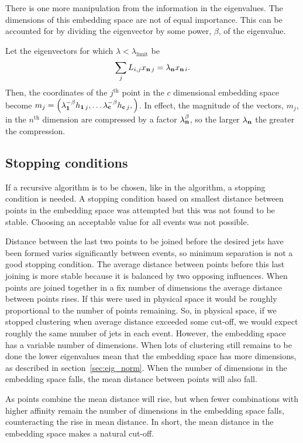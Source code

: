 There is one more manipulation from the information in the eigenvalues.
The dimensions of this embedding space are not of equal importance.
This can be accounted for by dividing the eigenvector by some power, \(\beta\), of the eigenvalue.

Let the eigenvectors for which \(\lambda < \lambda_\text{limit}\) be
\begin{equation}
    \sum_j L_{i, j} x_{\textbf{n}\,j} = \lambda_{\textbf{n}} x_{\textbf{n}\,i}.
\end{equation}
Then, the coordinates of the \(j^\text{th}\) point in the \(c\) dimensional embedding space
become \(m_j = \left(\lambda_{\textbf{1}}^{-\beta} h_{\textbf{1}\,j}, \dots \lambda_{\textbf{c}}^{-\beta} h_{\textbf{c}\,j},\right)\).
In effect, the magnitude of the vectors, \(m_j\), in the \(n^\text{th}\) dimension are compressed by a factor \(\lambda_{\textbf{n}}^\beta\),
so the larger \(\lambda_{\textbf{n}}\) the greater the compression.

\subsection{Stopping conditions}\label{sec:stopping_condintion}

If a recursive algorithm is to be chosen, like in the \genkt{} algorithm, a stopping condition is needed.
A stopping condition based on smallest distance between points in the embedding space was attempted 
but this was not found to be stable.
Choosing an acceptable value for all events was not possible.

Distance between the last two points to be joined before the desired jets have been formed
 varies significantly between events, so minimum separation is not a good stopping condition.
The average distance between points before this last joining is more stable because it 
is balanced by two opposing influences.
When points are joined together in a fix number of dimensions the average
distance between points rises.
If this were used in physical space it would be roughly proportional to the number of points remaining.
So, in physical space, if we stopped clustering when average distance exceeded some cut-off,
we would expect roughly the same number of jets in each event.
However, the embedding space has a variable number of dimensions.
When lots of clustering still remains to be done the lower eigenvalues mean that
the embedding space has more dimensions,
as described in section~\ref{sec:eig_norm}.
When the number of dimensions in the embedding space falls,
the mean distance between points will also fall.

As points combine the mean distance will rise,
but when fewer combinations with higher affinity remain the number of
dimensions in the embedding space falls, counteracting the rise in mean distance.
In short, the mean distance in the embedding space makes a natural cut-off.
